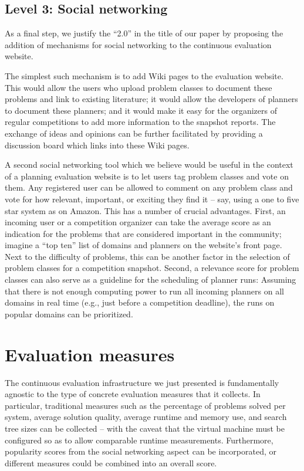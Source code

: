 \subsection{Level 3: Social networking}

As a final step, we justify the ``2.0'' in the title of our paper by
proposing the addition of mechanisms for social networking to the
continuous evaluation website.

The simplest such mechanism is to add Wiki pages to the evaluation
website.  This would allow the users who upload problem classes to
document these problems and link to existing literature; it would
allow the developers of planners to document these planners; and it
would make it easy for the organizers of regular competitions to add
more information to the snapshot reports.  The exchange of ideas and
opinions can be further facilitated by providing a discussion board
which links into these Wiki pages.

A second social networking tool which we believe would be useful in
the context of a planning evaluation website is to let users tag
problem classes and vote on them.  Any registered user can be allowed
to comment on any problem class and vote for how relevant, important,
or exciting they find it -- say, using a one to five star system as on
Amazon.  This has a number of crucial advantages.  First, an incoming
user or a competition organizer can take the average score as an
indication for the problems that are considered important in the
community; imagine a ``top ten'' list of domains and planners on the
website's front page.  Next to the difficulty of problems, this can be
another factor in the selection of problem classes for a competition
snapshot.  Second, a relevance score for problem classes can also
serve as a guideline for the scheduling of planner runs: Assuming that
there is not enough computing power to run all incoming planners on
all domains in real time (e.g., just before a competition deadline),
the runs on popular domains can be prioritized.






\section{Evaluation measures}

The continuous evaluation infrastructure we just presented is
fundamentally agnostic to the type of concrete evaluation measures
that it collects.  In particular, traditional measures such as the
percentage of problems solved per system, average solution quality,
average runtime and memory use, and search tree sizes can be
collected -- with the caveat that the virtual machine must be
configured so as to allow comparable runtime measurements.
Furthermore, popularity scores from the social networking aspect can
be incorporated, or different measures could be combined into an
overall score.



